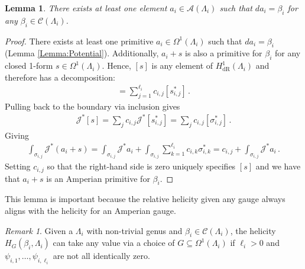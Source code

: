 \documentclass[11pt]{article}
\theoremstyle{plain}
\newtheorem{lemma}[theorem]{Lemma}
\theoremstyle{definition}
\theoremstyle{remark}
\newtheorem{remark}[theorem]{Remark}
\newcommand{\ST}{\Lambda}
\newcommand{\C}{\mathcal{C} (\ST_i)}
\begin{document}
\begin{lemma} \label{Lemma:gauge_exist}
    There exists at least one element \(a_i \in \mathscr{A}(\ST_i)\) such that \(da_i = \beta_i\) for any \(\beta_i \in \C\). 
\end{lemma}
\begin{proof}
There exists at least one primitive \(a_i \in  \Omega^1 (\ST_i)\) such that \(da_i = \beta_i\) (Lemma \ref{Lemma:Potential}). Additionally, \(a_i + s\) is also a primitive for \(\beta_i\) for any closed 1-form \(s \in  \Omega^1 (\ST_i)\). Hence, \([s]\) is any element of \(H^1_{\mathrm{dR}} (\ST_i)\) and therefore has a decomposition:
\begin{align*}
    [s] = \sum_{j=1}^{\ell_i} c_{i,j} [ s_{i,j}^* ] \, . 
\end{align*}
Pulling back to the boundary via inclusion gives
\begin{align*}
    \mathcal{J}^* [s] = \sum_j c_{i,j}  \mathcal{J}^* [s_{i,j}^*]  = \sum_j c_{i,j} [\sigma_{i,j}^*] \, . 
\end{align*}
Giving
\begin{align*}
    \int_{\sigma_{i,j}} \mathcal{J}^* (a_i + s) =  \int_{\sigma_{i,j}} \mathcal{J}^* a_i + \int_{\sigma_{i,j}}  \sum_{k=1}^{\ell_i} c_{i,k}  \sigma_{i,k}^*   = 
    c_{i,j} + \int_{\sigma_{i,j}} \mathcal{J}^* a_i    \, .
\end{align*}
Setting \(c_{i,j}\) so that the right-hand side is zero uniquely specifies \([s]\) and we have that \(a_i + s\) is an Amperian primitive for \(\beta_i\).
\end{proof}



This lemma is important because the relative helicity given any gauge always aligns with the helicity for an Amperian gauge. 



\begin{remark}\label{remark:helicity}
    Given a \(\ST_i\) with non-trivial genus and \(\beta_i \in \C\), the helicity \(H_{G} ( \beta_i, \ST_i)\) can take any value via a choice of \(G \subseteq \Omega^1(\ST_i) \) if \(\ell_i > 0\) and \(\psi_{i,1}, \dots, \psi_{i,\ell_i} \) are not all identically zero.
\end{remark}
\end{document}
